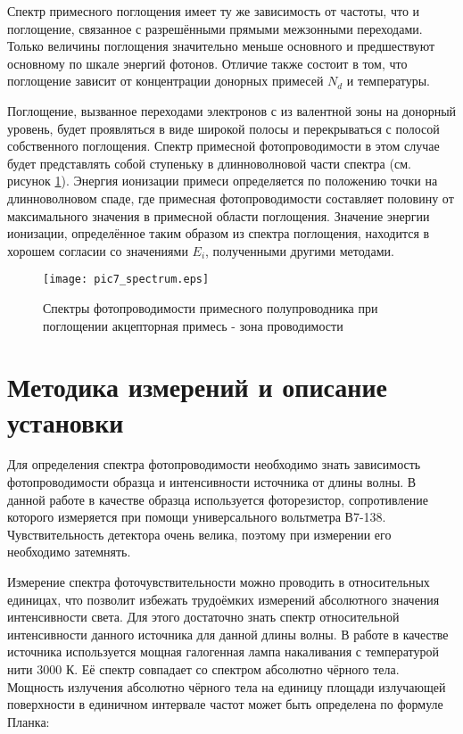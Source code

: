 Спектр примесного поглощения имеет ту же зависимость от частоты, что и поглощение, связанное с разрешёнными прямыми межзонными переходами. Только величины поглощения значительно меньше основного и предшествуют основному по шкале энергий фотонов. Отличие также состоит в том, что поглощение зависит от концентрации донорных примесей $N_{d}$ и температуры.

Поглощение, вызванное переходами электронов с из валентной зоны на донорный уровень, будет проявляться в виде широкой полосы и перекрываться с полосой собственного поглощения. Спектр примесной фотопроводимости в этом случае будет представлять собой ступеньку в длинноволновой части спектра (см. рисунок \ref{pic7_spectrum}). Энергия ионизации примеси определяется по положению точки на длинноволновом спаде, где примесная фотопроводимости составляет половину от максимального значения в примесной области поглощения. Значение энергии ионизации, определённое таким образом из спектра поглощения, находится в хорошем согласии со значениями $E_{i}$, полученными другими методами.

\begin{figure}[h!]\centering
\texttt{[image: pic7\_spectrum.eps]}
\caption{Спектры фотопроводимости примесного полупроводника при поглощении акцепторная примесь - зона проводимости}
\label{pic7_spectrum}
\end{figure}

\section{Методика измерений и описание установки}
Для определения спектра фотопроводимости необходимо знать зависимость фотопроводимости образца и интенсивности источника от длины волны. В данной работе в качестве образца используется фоторезистор, сопротивление которого измеряется при помощи универсального вольтметра В7-138. Чувствительность детектора очень велика, поэтому при измерении его необходимо затемнять.

Измерение спектра фоточувствительности можно проводить в относительных единицах, что позволит избежать трудоёмких измерений абсолютного значения интенсивности света. Для этого достаточно знать спектр относительной интенсивности данного источника для данной длины волны. В работе в качестве источника используется мощная галогенная лампа накаливания с температурой нити 3000 К. Её спектр совпадает со спектром абсолютно чёрного тела. Мощность излучения абсолютно чёрного тела на единицу площади излучающей поверхности в единичном интервале частот может быть определена по формуле Планка:

